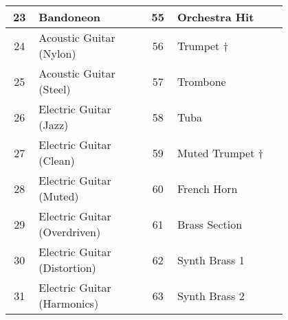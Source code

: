 \begin{tabular}{|c|p{0.4\linewidth}|c|p{0.4\linewidth}|}
	23  &  Bandoneon  & 55  &  Orchestra Hit  \\ \hline
	24  &  Acoustic Guitar (Nylon)  & 56  &  Trumpet † \\ \hline
	25  &  Acoustic Guitar (Steel)  & 57  &  Trombone  \\ \hline
	26  &  Electric Guitar (Jazz)  & 58  &  Tuba  \\ \hline
	27  &  Electric Guitar (Clean)  & 59  &  Muted Trumpet † \\ \hline
	28  &  Electric Guitar (Muted)  & 60  &  French Horn  \\ \hline
	29  &  Electric Guitar (Overdriven)  & 61  &  Brass Section  \\ \hline
	30  &  Electric Guitar (Distortion)  & 62  &  Synth Brass 1  \\ \hline
	31  &  Electric Guitar (Harmonics)  & 63  &  Synth Brass 2  \\ \hline
\end{tabular}

